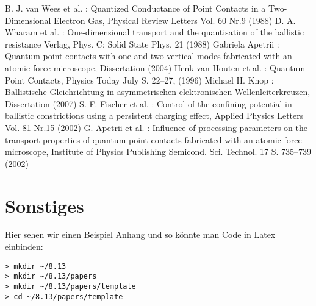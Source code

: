 \documentclass[aps,twocolumn,secnumarabic,nobalancelastpage,amsmath,amssymb,
nofootinbib,superscriptaddress]{revtex4-1}
\begin{document}


\begin{thebibliography}{99}
B. J. van Wees et al. : Quantized Conductance of Point Contacts in a Two-Dimensional Electron Gas, Physical Review Letters Vol. 60 Nr.9 (1988)
D. A. Wharam et al. : One-dimensional transport and the quantisation of the ballistic resistance Verlag, Phys. C: Solid State Phys. 21  (1988)
Gabriela Apetrii : Quantum point contacts with one and two vertical modes fabricated with an atomic force microscope, Dissertation (2004)
Henk van Houten et al. :  Quantum Point Contacts, Physics Today July S. 22–27, (1996)
Michael H. Knop :  Ballistische Gleichrichtung in asymmetrischen elektronischen Wellenleiterkreuzen, Dissertation (2007)
S. F. Fischer et al. :  Control of the confining potential in ballistic constrictions using a persistent charging effect, Applied Physics Letters Vol. 81 Nr.15 (2002)
G. Apetrii et al. :  Influence of processing parameters on the transport properties of quantum point contacts fabricated with an atomic force microscope, Institute of Physics Publishing Semicond. Sci. Technol. 17 S. 735–739 (2002)
\end{thebibliography}


\clearpage
\appendix

\section{Sonstiges}
Hier sehen wir einen Beispiel Anhang und so könnte man Code in Latex einbinden:
\begin{verbatim}
> mkdir ~/8.13
> mkdir ~/8.13/papers
> mkdir ~/8.13/papers/template
> cd ~/8.13/papers/template
\end{verbatim}


\end{document}
